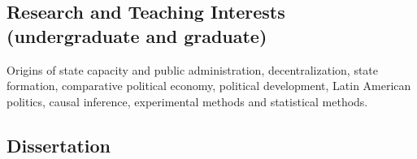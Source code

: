 \subsection*{Research and Teaching Interests (undergraduate and graduate)}

Origins of state capacity and public administration, decentralization, state formation, comparative political economy, political development, Latin American politics, causal inference, experimental methods and statistical methods.

\subsection*{Dissertation}

	{\unskip}
